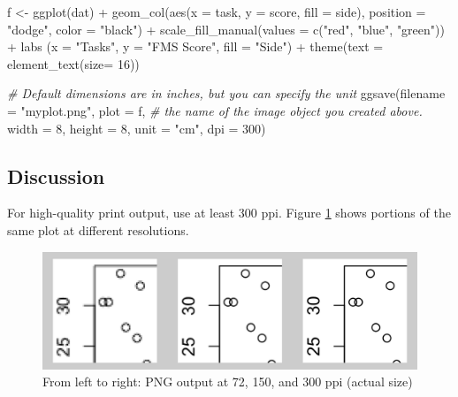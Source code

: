 \documentclass[
]{book}
\newenvironment{Shaded}{\begin{snugshade}}{\end{snugshade}}
\newcommand{\AttributeTok}[1]{\textcolor[rgb]{0.77,0.63,0.00}{#1}}
\newcommand{\CommentTok}[1]{\textcolor[rgb]{0.56,0.35,0.01}{\textit{#1}}}
\newcommand{\DecValTok}[1]{\textcolor[rgb]{0.00,0.00,0.81}{#1}}
\newcommand{\FunctionTok}[1]{\textcolor[rgb]{0.00,0.00,0.00}{#1}}
\newcommand{\NormalTok}[1]{#1}
\newcommand{\OtherTok}[1]{\textcolor[rgb]{0.56,0.35,0.01}{#1}}
\newcommand{\SpecialCharTok}[1]{\textcolor[rgb]{0.00,0.00,0.00}{#1}}
\newcommand{\StringTok}[1]{\textcolor[rgb]{0.31,0.60,0.02}{#1}}
\begin{document}
\begin{Shaded}
\begin{Highlighting}[]
\NormalTok{f }\OtherTok{\textless{}{-}} \FunctionTok{ggplot}\NormalTok{(dat) }\SpecialCharTok{+}
  \FunctionTok{geom\_col}\NormalTok{(}\FunctionTok{aes}\NormalTok{(}\AttributeTok{x =}\NormalTok{ task, }\AttributeTok{y =}\NormalTok{ score, }\AttributeTok{fill =}\NormalTok{ side), }\AttributeTok{position =} \StringTok{"dodge"}\NormalTok{, }\AttributeTok{color =} \StringTok{"black"}\NormalTok{) }\SpecialCharTok{+}
  \FunctionTok{scale\_fill\_manual}\NormalTok{(}\AttributeTok{values =} \FunctionTok{c}\NormalTok{(}\StringTok{"red"}\NormalTok{, }\StringTok{"blue"}\NormalTok{, }\StringTok{"green"}\NormalTok{)) }\SpecialCharTok{+}
  \FunctionTok{labs}\NormalTok{ (}\AttributeTok{x =} \StringTok{"Tasks"}\NormalTok{,}
        \AttributeTok{y =} \StringTok{"FMS Score"}\NormalTok{,}
        \AttributeTok{fill =} \StringTok{"Side"}\NormalTok{) }\SpecialCharTok{+}
  \FunctionTok{theme}\NormalTok{(}\AttributeTok{text =} \FunctionTok{element\_text}\NormalTok{(}\AttributeTok{size=} \DecValTok{16}\NormalTok{))}

\CommentTok{\# Default dimensions are in inches, but you can specify the unit}
\FunctionTok{ggsave}\NormalTok{(}\AttributeTok{filename =} \StringTok{"myplot.png"}\NormalTok{, }
       \AttributeTok{plot =}\NormalTok{ f, }\CommentTok{\# the name of the image object you created above.}
       \AttributeTok{width =} \DecValTok{8}\NormalTok{, }
       \AttributeTok{height =} \DecValTok{8}\NormalTok{, }
       \AttributeTok{unit =} \StringTok{"cm"}\NormalTok{, }
       \AttributeTok{dpi =} \DecValTok{300}\NormalTok{)}
\end{Highlighting}
\end{Shaded}

\hypertarget{discussion-11}{%
\subsection{Discussion}\label{discussion-11}}

For high-quality print output, use at least 300 ppi. Figure \ref{fig:FIG-OUTPUT-BITMAP-RES} shows portions of the same plot at different resolutions.

\begin{figure}

{\centering \includegraphics[width=15in]{images/chapter-6/output-ppi} 

}

\caption[From left to right]{From left to right: PNG output at 72, 150, and 300 ppi (actual size)}\label{fig:FIG-OUTPUT-BITMAP-RES}
\end{figure}
\end{document}
